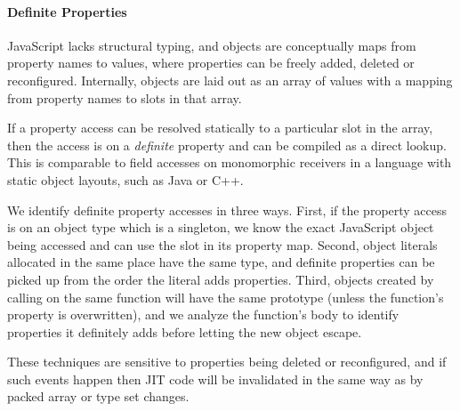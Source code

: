\paragraph{Definite Properties}

JavaScript lacks structural typing, and objects are conceptually maps
from property names to values, where properties can be freely added,
deleted or reconfigured.
Internally, objects are laid out as an array of values with a mapping from
property names to slots in that array.

If a property access can be resolved statically to a particular slot in the
array, then the access is on a {\it definite} property and can be compiled
as a direct lookup. This is comparable to
field accesses on monomorphic receivers in a language with static object layouts,
such as Java or C++.

We identify definite property accesses in three ways.
First, if the property access is on an object type which is a singleton,
we know the exact JavaScript object being accessed and can use the slot
in its property map.
Second, object literals allocated in the same place have the same type,
and definite properties can be picked up from the order the literal
adds properties.
Third, objects created by calling  on the same function will have the
same prototype (unless the function's  property is overwritten),
and we analyze the function's body to identify properties it definitely
adds before letting the new object escape.

These techniques are sensitive to properties being deleted or
reconfigured, and if such events happen then JIT code will be invalidated
in the same way as by packed array or type set changes.

